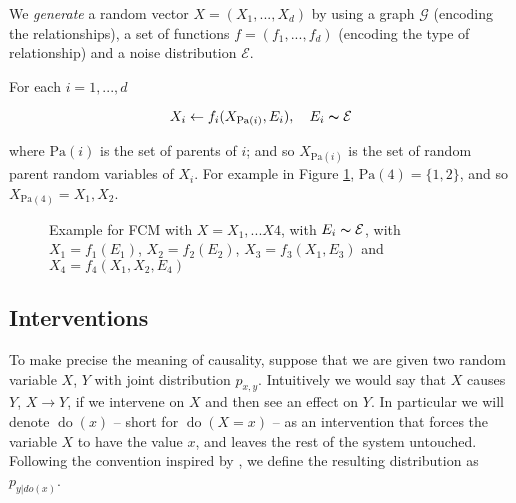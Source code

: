We \textit{generate} a random vector $X = (X_1, ..., X_d)$ by using a graph $\mathcal{G}$ (encoding the relationships),
a set of functions $f = (f_1, ..., f_d)$ (encoding the type of relationship) and a noise distribution $\mathcal{E}$.

For each $i = 1, ..., d$

$$
    X_i \leftarrow f_i(X_{\text{Pa}(i)}, E_i), \quad E_i \thicksim \mathcal{E}
$$

where $\text{Pa}(i)$ is the set of parents of $i$; and so $X_{\text{Pa}(i)}$ is the set of random parent
random variables of $X_i$. For example in Figure \ref{fig:fcm_1}, $\text{Pa}(4) = \{1, 2\}$, 
and so $X_{\text{Pa}(4)} = X_1, X_2$.

\begin{figure}[!h]
    \centering

    \caption{ Example for FCM with $X = X_1, ... X4$, with $E_i \thicksim \mathcal{E}$, 
    with $X_1 = f_1(E_1)$, $X_2 = f_2(E_2)$, $X_3 = f_3(X_1, E_3)$ and 
    $X_4 = f_4(X_1, X_2, E_4)$}
    \label{fig:fcm_1}

\end{figure}



\subsection{Interventions}

To make precise the meaning of causality, suppose that we are given 
two random variable $X$, $Y$ with joint distribution $p_{x, y}$. Intuitively we 
would say that $X$ causes $Y$, $X \rightarrow Y$, if we intervene on $X$ and then see an effect on $Y$. In particular
we will denote $\operatorname{do}(x)$ -- short for $\operatorname{do}(X = x)$ -- as an intervention
that forces the variable $X$ to have the value $x$, and leaves the rest of the system untouched. 
Following the convention inspired by \cite{pearl2000causality}, 
we define the resulting distribution as $p_{y|do(x)}$.

